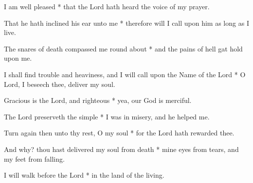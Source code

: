 I am well pleased * that the Lord hath heard the voice of my prayer.

That he hath inclined his ear unto me * therefore will I call upon him as long as I live.

The snares of death compassed me round about * and the pains of hell gat hold upon me.

I shall find trouble and heaviness, and I will call upon the Name of the Lord * O Lord, I beseech thee, deliver my soul.

Gracious is the Lord, and righteous * yea, our God is merciful.

The Lord preserveth the simple * I was in misery, and he helped me.

Turn again then unto thy rest, O my soul * for the Lord hath rewarded thee.

And why? thou hast delivered my soul from death * mine eyes from tears, and my feet from falling.

I will walk before the Lord * in the land of the living.